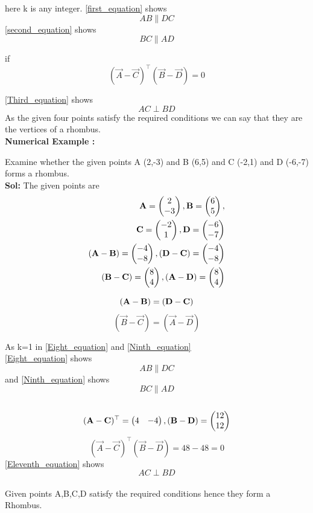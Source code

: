 \documentclass{article}
\begin{document}
{here k is any integer.}
\eqref{first_equation} shows 
$$AB \parallel DC $$
\eqref{second_equation} shows 
$$BC \parallel AD$$

if 
\begin{equation}\label{Third_equation}
(\vec{A}-\vec{C} )^ \top ( \vec{B}-\vec{D} ) = 0 
\end{equation}

\eqref{Third_equation} shows
$$AC \perp BD $$
{As the given four points satisfy the required conditions we can say that they are the vertices of a rhombus.}\\
\textbf{Numerical Example :}
 
{Examine whether the given points A (2,-3) and B (6,5) and C (-2,1) and D (-6,-7) forms a rhombus.}\\

 \textbf{Sol:}
 The given points are
\begin{align} 
\vec{A} = \myvec{2\\-3},\vec{B} =\myvec{6\\5},\\
\vec{C} =\myvec{-2\\1}, \vec{D} =\myvec{-6\\-7}\\
(\vec{A}-\vec{B} ) = \myvec{-4\\-8}, (\vec{D}-\vec{C} ) = \myvec{-4\\-8}\\
(\vec{B}-\vec{C} ) = \myvec{8\\4}, (\vec{A}-\vec{D} ) = \myvec{8\\4}
\end{align} 

\begin{equation}\label{Eight_equation}
(\vec{A}-\vec{B} ) = (\vec{D}-\vec{C} )  \\
\end{equation}
\begin{equation}\label{Ninth_equation}
(\vec{B}-\vec{C} )  = (\vec{A}-\vec{D} ) 
\end{equation}

{As k=1 in \eqref{Eight_equation} and \eqref{Ninth_equation}}\\

\eqref{Eight_equation} shows $$ AB  {\parallel} DC $$ and \eqref{Ninth_equation} shows $$BC \parallel AD $$\\
    
\begin{align}
(\vec{A}-\vec{C} )^\top = \myvec{4&-4 }
,(\vec{B}-\vec{D} ) = \myvec{12\\12}
\end{align}
\begin{equation}\label{Eleventh_equation}
(\vec{A}-\vec{C} )^ \top ( \vec{B}-\vec{D} ) = 48-48 = 0
\end{equation}
 \eqref{Eleventh_equation} shows
$$AC \perp BD $$\\ 
{Given points A,B,C,D satisfy the required 
conditions hence they form a Rhombus.}
\end{document}
